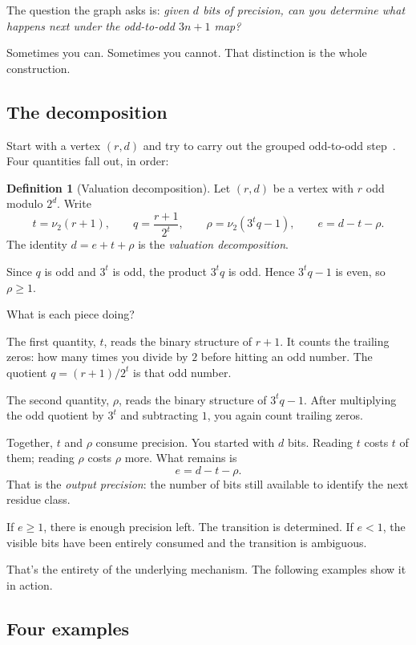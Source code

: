 \documentclass[11pt]{amsart}
\theoremstyle{definition}
\newtheorem{definition}[theorem]{Definition}
\theoremstyle{remark}
\newcommand{\nuu}{\nu_2}
\begin{document}
The question the graph asks is: \emph{given $d$ bits of precision, can you determine what happens next under the odd-to-odd $3n+1$ map?}

Sometimes you can.  Sometimes you cannot.  That distinction is the whole construction.

\subsection{The decomposition}
Start with a vertex $(r,d)$ and try to carry out the grouped odd-to-odd step~\cite{Wirsching1998}.  Four quantities fall out, in order:

\begin{definition}[Valuation decomposition]\label{def:valuation}
Let $(r,d)$ be a vertex with $r$ odd modulo $2^d$.  Write
\[
t=\nuu(r+1),\qquad q=\frac{r+1}{2^t},\qquad
\rho=\nuu(3^tq-1),\qquad e=d-t-\rho.
\]
The identity $d=e+t+\rho$ is the \emph{valuation decomposition}.

Since \(q\) is odd and \(3^t\) is odd, the product \(3^tq\) is odd. Hence \(3^tq-1\) is even, so \(\rho\ge1\).
\end{definition}



What is each piece doing?

The first quantity, $t$, reads the binary structure of $r+1$.  It counts the trailing zeros: how many times you divide by $2$ before hitting an odd number.  The quotient $q=(r+1)/2^t$ is that odd number.

The second quantity, $\rho$, reads the binary structure of $3^tq-1$.  After multiplying the odd quotient by $3^t$ and subtracting $1$, you again count trailing zeros.

Together, $t$ and $\rho$ consume precision.  You started with $d$ bits.  Reading $t$ costs $t$ of them; reading $\rho$ costs $\rho$ more.  What remains is
\[
e=d-t-\rho.
\]
That is the \emph{output precision}: the number of bits still available to identify the next residue class.

If $e\ge1$, there is enough precision left.  The transition is determined.  If $e<1$, the visible bits have been entirely consumed and the transition is ambiguous.

That's the entirety of the underlying mechanism. The following examples show it in action.

\subsection{Four examples}\label{subsec:examples}
\end{document}
